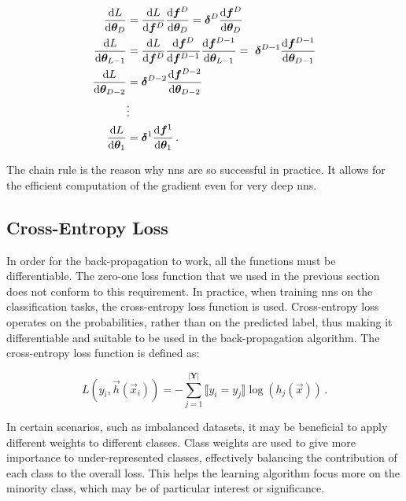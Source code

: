 \begin{align}
    \dv{L}{\nnparams_D}     & = \dv{L}{\vec{f}^D} \dv{\vec{f}^D}{\nnparams_{D}} = \vec{\delta}^D \dv{\vec{f}^D}{\nnparams_{D}} \\
    \dv{L}{\nnparams_{L-1}} & = \dv{L}{\vec{f}^D} \dv{\vec{f}^D}{\vec{f}^{D-1}} \dv{\vec{f}^{D-1}}{\nnparams_{L-1}} =\
    \vec{\delta}^{D-1} \dv{\vec{f}^{D-1}}{\nnparams_{D-1}}                                                                     \\
    \dv{L}{\nnparams_{D-2}} & = \vec{\delta}^{D-2} \dv{\vec{f}^{D-2}}{\nnparams_{D-2}}                                         \\
                            & \vdots \nonumber                                                                                 \\
    \dv{L}{\nnparams_{1}}   & = \vec{\delta}^1 \dv{\vec{f}^1}{\nnparams_{1}}\,.
\end{align}

The chain rule is the reason why \glspl{nn} are so successful in practice. It allows for the efficient computation of
the gradient even for very deep \glspl{nn}.






\subsection{Cross-Entropy Loss}
\label{sec:cross-entropy}

In order for the back-propagation to work, all the functions must be differentiable. The zero-one loss function that we
used in the previous section does not conform to this requirement. In practice, when training \glspl{nn} on the
classification tasks, the cross-entropy loss function is used. Cross-entropy loss operates on the probabilities, rather
than on the predicted label, thus making it differentiable and suitable to be used in the back-propagation algorithm.
The cross-entropy loss function is defined as:

\begin{equation}
    \label{eq:no-weight}
    L(y_i, \vec{h}(\vec{x}_i)) = -\sum_{j = 1}^{|\textbf{Y}|} \llbracket y_i = y_j \rrbracket \log(h_j(\vec{x}))\,.
\end{equation}

In certain scenarios, such as imbalanced datasets, it may be beneficial to apply different weights to different classes.
Class weights are used to give more importance to under-represented classes, effectively balancing the contribution of
each class to the overall loss. This helps the learning algorithm focus more on the minority class, which may be of
particular interest or significance.

